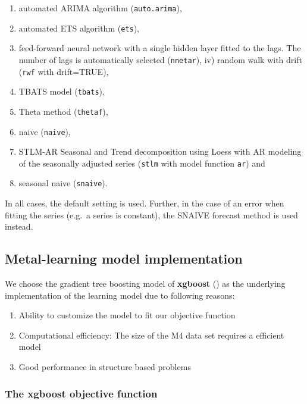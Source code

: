 \documentclass[11pt,a4paper,]{article}
\providecommand{\tightlist}{%
  \setlength{\itemsep}{0pt}\setlength{\parskip}{0pt}}
\theoremstyle{definition}
\theoremstyle{definition}
\theoremstyle{definition}
\theoremstyle{remark}
\begin{document}
\begin{enumerate}
\def\labelenumi{\roman{enumi})}
\item
  automated ARIMA algorithm (\texttt{auto.arima}),
\item
  automated ETS algorithm (\texttt{ets}),
\item
  feed-forward neural network with a single hidden layer fitted to the
  lags. The number of lags is automatically selected (\texttt{nnetar}),
  iv) random walk with drift (\texttt{rwf} with drift=TRUE),
\item
  TBATS model (\texttt{tbats}),
\item
  Theta method (\texttt{thetaf}),
\item
  naive (\texttt{naive}),
\item
  STLM-AR Seasonal and Trend decomposition using Loess with AR modeling
  of the seasonally adjusted series (\texttt{stlm} with model function
  \texttt{ar}) and
\item
  seasonal naive (\texttt{snaive}).
\end{enumerate}

In all cases, the default setting is used. Further, in the case of an
error when fitting the series (e.g.~a series is constant), the SNAIVE
forecast method is used instead.


\subsection{Metal-learning model
implementation}\label{metal-learning-model-implementation}


We choose the gradient tree boosting model of \textbf{xgboost}
(\textcite{chen2016xgboost}) as the underlying implementation of the
learning model due to following reasons:

\begin{enumerate}
\def\labelenumi{\arabic{enumi}.}
\tightlist
\item
  Ability to customize the model to fit our objective function
\item
  Computational efficiency: The size of the M4 data set requires a
  efficient model
\item
  Good performance in structure based problems
\end{enumerate}

\subsubsection{The xgboost objective
function}\label{the-xgboost-objective-function}
\end{document}
